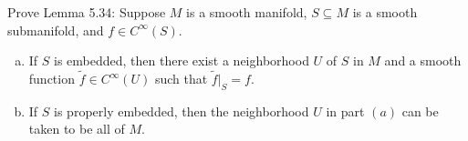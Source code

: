 Prove Lemma 5.34: Suppose $M$ is a smooth manifold, $S \subseteq M$ is a smooth submanifold, and $f \in C^\infty(S)$.
\begin{enumerate}[a)]
\item If $S$ is embedded, then there exist a neighborhood $U$ of $S$ in $M$ and a smooth function $\tilde{f} \in C^\infty(U)$ such that $\tilde{f}|_S = f$.
\item If $S$ is properly embedded, then the neighborhood $U$ in part $(a)$ can be taken to be all of $M$.
\end{enumerate}